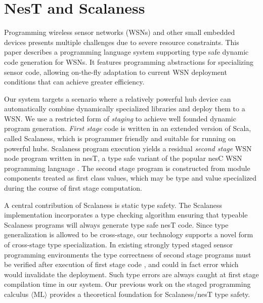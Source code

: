 
\chapter{NesT and Scalaness}
\label{chapter-nest-scalaness}


Programming wireless sensor networks (WSNs) and other small embedded
devices presents multiple challenges due to severe resource
constraints.  This paper describes a programming language system
supporting type safe dynamic code generation for WSNs. It features
programming abstractions for specializing sensor code, allowing
on-the-fly adaptation to current WSN deployment conditions that can achieve greater
efficiency. %

Our system targets a scenario where a relatively powerful hub device
can automatically combine dynamically specialized libraries and deploy
them to a WSN. We use a restricted form of \emph{staging}
\cite{metaml-main,DBLP:conf/icess/Taha04,289140} to achieve
well founded dynamic program generation.  \emph{First stage} code is
written in an extended version of Scala, called Scalaness, which is
programmer friendly and suitable for running on powerful hubs.
Scalaness program execution yields a residual \emph{second stage} WSN
node program written in nesT, a type safe variant of the popular nesC
WSN programming language \cite{Gay-nesC-2003}.  The second stage
program is constructed from module components treated as first class
values, which may be type and value specialized during the course of
first stage computation.

A central contribution of Scalaness is static type safety. The
Scalaness implementation incorporates a type checking algorithm
ensuring that typeable Scalaness programs will always generate type
safe nesT code.  Since type generalization is allowed to be
cross-stage, our technology supports a novel form of cross-stage type
specialization.  In existing strongly typed staged sensor programming
environments the type correctness of second stage programs must be
verified after execution of first stage code
\cite{Mainland-Flask-2008}, and could in fact error which would
invalidate the deployment.  Such type errors are always caught at
first stage compilation time in our system.  Our previous work on the
staged programming calculus $\langle \text{ML} \rangle$
\cite{FramedML} provides a theoretical foundation for Scalaness/nesT
type safety.

